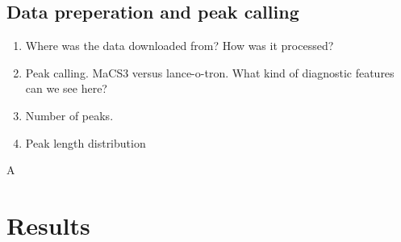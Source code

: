 \subsection{Data preperation and peak calling}

\begin{enumerate}
    \item Where was the data downloaded from? How was it processed?
    \item Peak calling. MaCS3 versus lance-o-tron. What kind of diagnostic features can we see here? 
    \item Number of peaks. 
    \item Peak length distribution
\end{enumerate}A


\section{Results}



